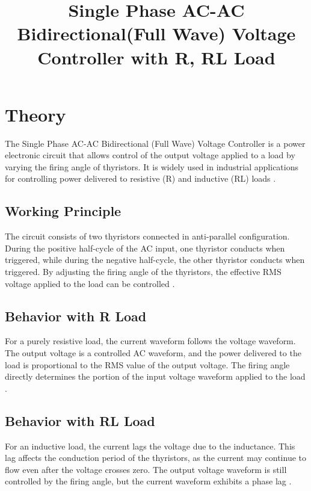 \documentclass[12pt]{article}
\title{Single Phase AC-AC Bidirectional(Full Wave) Voltage Controller with R, RL Load}
\author{}
\date{}
\begin{document}


\pagebreak

\tableofcontents

\pagebreak
{}
\maketitle

\section*{Theory}
The Single Phase AC-AC Bidirectional (Full Wave) Voltage Controller is a power electronic circuit that allows control of the output voltage applied to a load by varying the firing angle of thyristors. It is widely used in industrial applications for controlling power delivered to resistive (R) and inductive (RL) loads \cite{rashid2013power}.

\subsection*{Working Principle}
The circuit consists of two thyristors connected in anti-parallel configuration. During the positive half-cycle of the AC input, one thyristor conducts when triggered, while during the negative half-cycle, the other thyristor conducts when triggered. By adjusting the firing angle of the thyristors, the effective RMS voltage applied to the load can be controlled \cite{sen1987principles}.

\subsection*{Behavior with R Load}
For a purely resistive load, the current waveform follows the voltage waveform. The output voltage is a controlled AC waveform, and the power delivered to the load is proportional to the RMS value of the output voltage. The firing angle directly determines the portion of the input voltage waveform applied to the load \cite{mohan2003power}.

\subsection*{Behavior with RL Load}
For an inductive load, the current lags the voltage due to the inductance. This lag affects the conduction period of the thyristors, as the current may continue to flow even after the voltage crosses zero. The output voltage waveform is still controlled by the firing angle, but the current waveform exhibits a phase lag \cite{bose2002modern}.
\end{document}
